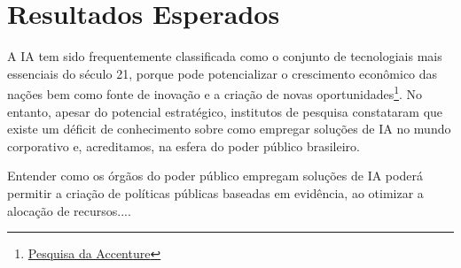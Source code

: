 \documentclass[12pt]{article}
\begin{document}







\section{Resultados Esperados}

A IA tem sido frequentemente classificada como o conjunto de tecnologiais mais essenciais do século 21, porque pode potencializar o crescimento econômico das nações bem como fonte de inovação e a criação de novas oportunidades\footnote{\href{https://www.accenture.com/\_acnmedia/PDF-57/Accenture-AI-Economic-Growth-Infographic.pdf}{Pesquisa da Accenture}}. No entanto, apesar do potencial estratégico, institutos de pesquisa constataram que existe um déficit de conhecimento sobre como empregar soluções de IA no mundo corporativo \cite{Pew2018} e, acreditamos, na esfera do poder público brasileiro.

Entender como os órgãos do poder público empregam soluções de IA poderá permitir a criação de políticas públicas baseadas em evidência, ao otimizar a alocação de recursos....







\end{document}
